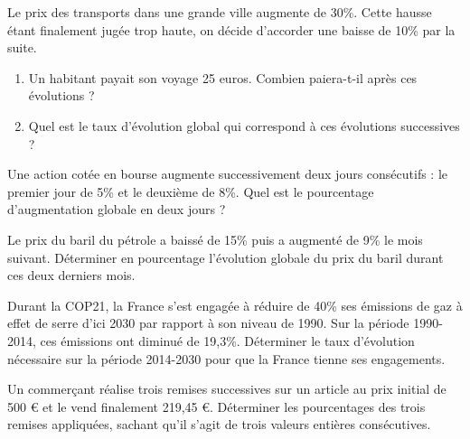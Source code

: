 {\begin{Exercice} %
Le prix des transports dans une grande ville augmente de 30\%. Cette hausse étant finalement jugée trop haute, on décide d'accorder une baisse de 10\% par la suite.
\begin{enumerate}
\item Un habitant payait son voyage 25 euros. Combien paiera-t-il après ces évolutions ?
\item Quel est le taux d'évolution global qui correspond à ces évolutions successives ?
\end{enumerate}
\end{Exercice}


\begin{Exercice} %
Une action cotée en bourse augmente successivement deux jours consécutifs : le premier jour de 5\% et le deuxième de 8\%. Quel est le pourcentage d'augmentation globale en deux jours ?
\end{Exercice}

\begin{Exercice} %
Le prix du baril du pétrole a baissé de 15\% puis a augmenté de 9\% le mois suivant. Déterminer en pourcentage l'évolution globale du prix du baril durant ces deux derniers mois.
\end{Exercice}

\begin{Exercice} %
Durant la COP21, la France s'est engagée à réduire de 40\% ses émissions de gaz à effet de serre d'ici 2030 par rapport à son niveau de 1990. Sur la période 1990-2014, ces émissions ont diminué de 19,3\%. Déterminer le taux d'évolution nécessaire sur la période 2014-2030 pour que la France tienne ses engagements.
\end{Exercice}


\begin{Exercice} %
Un commerçant réalise trois remises successives sur un article au prix initial de 500 € et le vend finalement 219,45 €. Déterminer les pourcentages des trois remises appliquées, sachant qu'il s'agit de trois valeurs entières consécutives.\\

\end{Exercice}

\begin{Exercice} %


\end{Exercice}}
